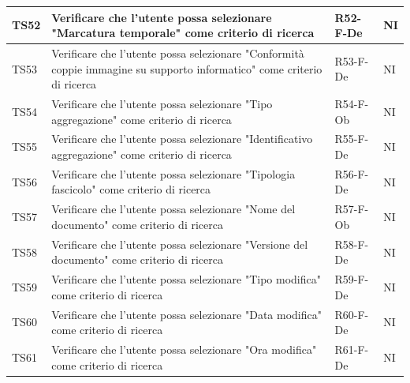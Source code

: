 \documentclass[a4paper,12pt]{article}
\begin{document}
\begin{longtable}{|M{1.2cm}|M{6.3cm}|M{2.5cm}|M{1.5cm}|}
                TS52 & Verificare che l'utente possa selezionare "Marcatura temporale" come criterio di ricerca & R52-F-De & NI \\
                \hline
                                
                TS53 & Verificare che l'utente possa selezionare "Conformità coppie immagine su supporto informatico" come criterio di ricerca & R53-F-De & NI \\
                \hline
                                
                TS54 & Verificare che l'utente possa selezionare "Tipo aggregazione" come criterio di ricerca & R54-F-Ob & NI \\
                \hline
                                
                TS55 & Verificare che l'utente possa selezionare "Identificativo aggregazione" come criterio di ricerca & R55-F-De & NI \\
                \hline
                                
                TS56 & Verificare che l'utente possa selezionare "Tipologia fascicolo" come criterio di ricerca & R56-F-De & NI \\
                \hline
                                
                TS57 & Verificare che l'utente possa selezionare "Nome del documento" come criterio di ricerca & R57-F-Ob & NI \\
                \hline
                                
                TS58 & Verificare che l'utente possa selezionare "Versione del documento" come criterio di ricerca & R58-F-De & NI \\
                \hline
                                
                TS59 & Verificare che l'utente possa selezionare "Tipo modifica" come criterio di ricerca & R59-F-De & NI \\
                \hline
                                
                TS60 & Verificare che l'utente possa selezionare "Data modifica" come criterio di ricerca & R60-F-De & NI \\
                \hline
                                
                TS61 & Verificare che l'utente possa selezionare "Ora modifica" come criterio di ricerca & R61-F-De & NI \\
                \hline
                                

\end{longtable}
\end{document}
